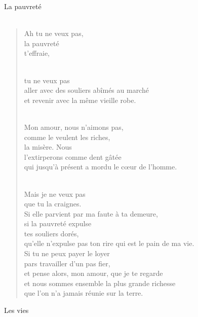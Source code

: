 \documentclass[11pt,a4paper]{book}
\begin{document}
\newpage

{\huge La pauvreté} \\ \\

\begin{verse}
Ah tu ne veux pas, \\
la pauvreté \\
t'effraie, \\ \

tu ne veux pas \\
aller avec des souliers abîmés au marché \\
et revenir avec la même vieille robe. \\ \

Mon amour, nous n'aimons pas, \\
comme le veulent les riches, \\
la misère. Nous \\
l'extirperons comme dent gâtée \\
qui jusqu'à présent a mordu le c{\oe}ur de l'homme. \\ \

Mais je ne veux pas \\
que tu la craignes. \\
Si elle parvient par ma faute à ta demeure, \\
si la pauvreté expulse \\
tes souliers dorés, \\
qu'elle n'expulse pas ton rire qui est le pain de ma vie. \\
Si tu ne peux payer le loyer \\
pars travailler d'un pas fier, \\
et pense alors, mon amour, que je te regarde \\
et nous sommes ensemble la plus grande richesse \\
que l'on n'a jamais réunie sur la terre.
\end{verse}

\newpage

{\huge Les vies} \\ \\
\end{document}

